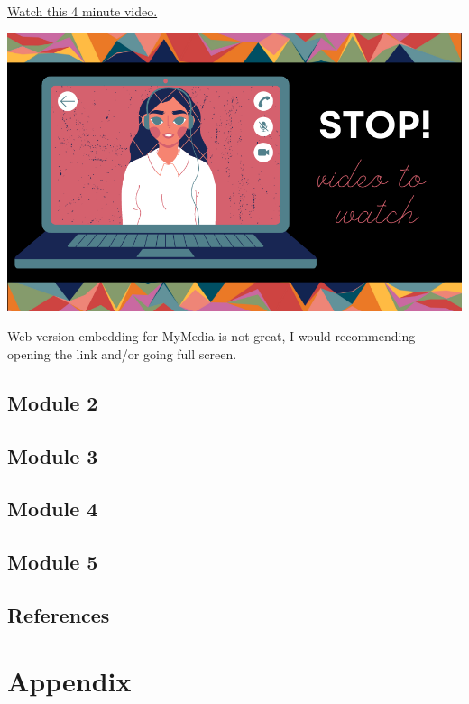 \documentclass[
  openany]{book}
\begin{document}
\href{https://play.library.utoronto.ca/f395cfcc26b4009cbc28c1aa9a86096c}{Watch this 4 minute video.}

\begin{center}\includegraphics[width=0.6\linewidth]{images/stop-video} \end{center}

Web version embedding for MyMedia is not great, I would recommending opening the link and/or going full screen.

\hypertarget{module-2}{%
\chapter{Module 2}\label{module-2}}

\hypertarget{module-3}{%
\chapter{Module 3}\label{module-3}}

\hypertarget{module-4}{%
\chapter{Module 4}\label{module-4}}

\hypertarget{module-5}{%
\chapter{Module 5}\label{module-5}}

\hypertarget{references}{%
\chapter*{References}\label{references}}

\hypertarget{part-appendix}{%
\part*{Appendix}\label{part-appendix}}
\end{document}
